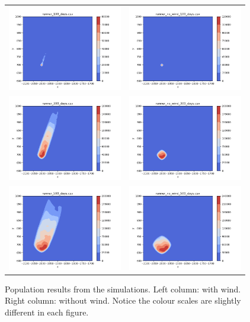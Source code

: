 \documentclass{article}
\begin{document}
\begin{figure}[p]
  \centering
  \begin{tabular}{cc}
    \includegraphics[width=5cm]{runner_100_days.png} &
    \includegraphics[width=5cm]{runner_no_wind_100_days.png}
    \\
    \includegraphics[width=5cm]{runner_300_days.png} &
    \includegraphics[width=5cm]{runner_no_wind_300_days.png}
    \\
    \includegraphics[width=5cm]{runner_500_days.png} &
    \includegraphics[width=5cm]{runner_no_wind_500_days.png}
  \end{tabular}
  \caption{\label{results.fig}Population results from the simulations.  Left column: with wind.  Right column: without wind.  Notice the colour scales are slightly different in each figure.}
\end{figure}
    






  
\end{document}
